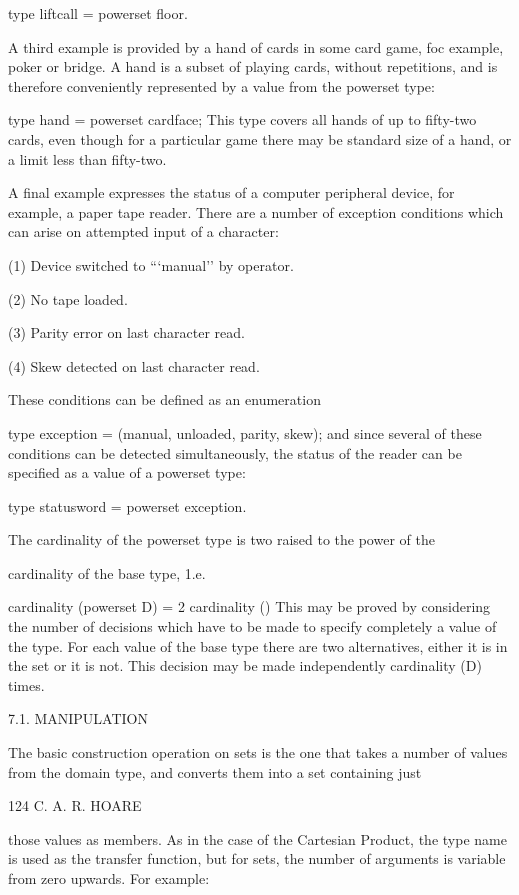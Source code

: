 {{{			type liftcall = powerset floor.
			
			A third example is provided by a hand of cards in some card game, foc example, poker or bridge. A hand is a subset of playing cards, without repetitions, and is therefore conveniently represented by a value from the powerset type:
			
			type hand = powerset cardface; This type covers all hands of up to fifty-two cards, even though for a particular game there may be standard size of a hand, or a limit less than fifty-two.
			
			A final example expresses the status of a computer peripheral device, for example, a paper tape reader. There are a number of exception conditions which can arise on attempted input of a character:
			
			(1) Device switched to “‘manual’’ by operator.
			
			(2) No tape loaded.
			
			(3) Parity error on last character read.
			
			(4) Skew detected on last character read.
			
			These conditions can be defined as an enumeration
			
			type exception = (manual, unloaded, parity, skew); and since several of these conditions can be detected simultaneously, the status of the reader can be specified as a value of a powerset type:
			
			type statusword = powerset exception.
			
			The cardinality of the powerset type is two raised to the power of the
			
			cardinality of the base type, 1.e.
			
			cardinality (powerset D) = 2 cardinality () This may be proved by considering the number of decisions which have to be made to specify completely a value of the type. For each value of the base type there are two alternatives, either it is in the set or it is not. This decision may be made independently cardinality (D) times.
			
			7.1. MANIPULATION
			
			The basic construction operation on sets is the one that takes a number of values from the domain type, and converts them into a set containing just
			
			124 C. A. R. HOARE
			
			those values as members. As in the case of the Cartesian Product, the type name is used as the transfer function, but for sets, the number of arguments is variable from zero upwards. For example:
			
}}}
